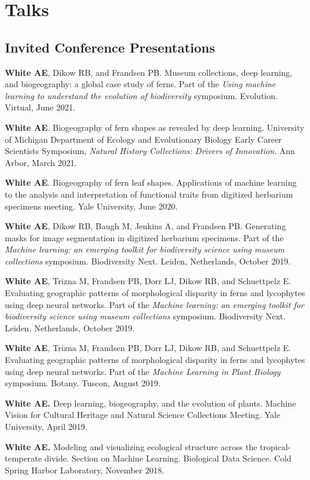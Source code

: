 \documentclass[letterpaper]{article}
\newenvironment{biblist}{%
   \begin{list}{}{%
     \setlength{\labelwidth}{0pt}%
     \setlength{\labelsep}{1em}%
     \setlength{\leftmargin}{2em}%
     \setlength{\itemindent}{-1em}%
   }
}{\end{list}}
\begin{document}
\section*{Talks}
\subsection*{Invited Conference Presentations}
\begin{biblist}
\item \textbf{White AE}, Dikow RB, and Frandsen PB. Museum collections, deep learning, and biogeography: a global case study of ferns. Part of the \textit{Using machine learning to understand the evolution of biodiversity} symposium. Evolution. Virtual, June 2021.

\item \textbf{White AE}. Biogeography of fern shapes as revealed by deep learning. University of Michigan Department of Ecology and Evolutionary Biology Early Career Scientists Symposium, \textit{Natural History Collections: Drivers of Innovation}. Ann Arbor, March 2021.

\item \textbf{White AE}. Biogeography of fern leaf shapes. Applications of machine learning to the analysis and interpretation of functional traits from digitized herbarium specimens meeting. Yale University, June 2020.

\item \textbf{White AE}, Dikow RB, Baugh M, Jenkins A, and Frandsen PB. Generating masks for image segmentation in digitized herbarium specimens. Part of the \textit{Machine learning: an emerging toolkit for biodiversity science using museum collections} symposium. Biodiversity Next. Leiden, Netherlands, October 2019.

\item \textbf{White AE}, Trizna M, Frandsen PB, Dorr LJ, Dikow RB, and Schuettpelz E. Evaluating geographic patterns of morphological disparity in ferns and lycophytes using deep neural networks. Part of the \textit{Machine learning: an emerging toolkit for biodiversity science using museum collections} symposium. Biodiversity Next. Leiden, Netherlands, October 2019.

\item \textbf{White AE}, Trizna M, Frandsen PB, Dorr LJ, Dikow RB, and Schuettpelz E. Evaluating geographic patterns of morphological disparity in ferns and lycophytes using deep neural networks. Part of the \textit{Machine Learning in Plant Biology} symposium. Botany. Tuscon, August 2019.

\item \textbf{White AE.} Deep learning, biogeography, and the evolution of plants. Machine Vision for Cultural Heritage and Natural Science Collections Meeting. Yale University, April 2019.

\item \textbf{White AE.} Modeling and visualizing ecological structure across the tropical- temperate divide. Section on Machine Learning. Biological Data Science. Cold Spring Harbor Laboratory, November 2018.
\end{biblist}
\end{document}
